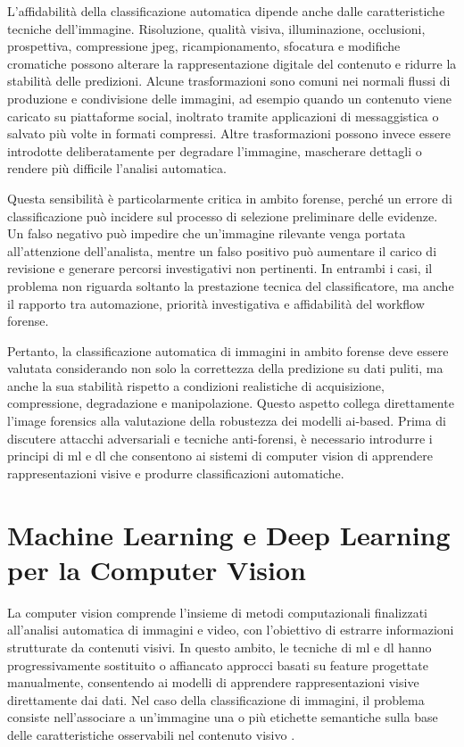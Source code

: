 L'affidabilità della classificazione automatica dipende anche dalle caratteristiche tecniche dell'immagine. Risoluzione, qualità visiva, illuminazione, occlusioni, prospettiva, compressione \gls{jpeg}, ricampionamento, sfocatura e modifiche cromatiche possono alterare la rappresentazione digitale del contenuto e ridurre la stabilità delle predizioni. Alcune trasformazioni sono comuni nei normali flussi di produzione e condivisione delle immagini, ad esempio quando un contenuto viene caricato su piattaforme social, inoltrato tramite applicazioni di messaggistica o salvato più volte in formati compressi. Altre trasformazioni possono invece essere introdotte deliberatamente per degradare l'immagine, mascherare dettagli o rendere più difficile l'analisi automatica.

Questa sensibilità è particolarmente critica in ambito forense, perché un errore di classificazione può incidere sul processo di selezione preliminare delle evidenze. Un falso negativo può impedire che un'immagine rilevante venga portata all'attenzione dell'analista, mentre un falso positivo può aumentare il carico di revisione e generare percorsi investigativi non pertinenti. In entrambi i casi, il problema non riguarda soltanto la prestazione tecnica del classificatore, ma anche il rapporto tra automazione, priorità investigativa e affidabilità del workflow forense.

Pertanto, la classificazione automatica di immagini in ambito forense deve essere valutata considerando non solo la correttezza della predizione su dati puliti, ma anche la sua stabilità rispetto a condizioni realistiche di acquisizione, compressione, degradazione e manipolazione. Questo aspetto collega direttamente l'image forensics alla valutazione della robustezza dei modelli \gls{ai}-based. Prima di discutere attacchi adversariali e tecniche anti-forensi, è necessario introdurre i principi di \gls{ml} e \gls{dl} che consentono ai sistemi di computer vision di apprendere rappresentazioni visive e produrre classificazioni automatiche.


\section{Machine Learning e Deep Learning per la Computer Vision}
\label{sec:background_ml_dl_cv}
La computer vision comprende l'insieme di metodi computazionali finalizzati all'analisi automatica di immagini e video, con l'obiettivo di estrarre informazioni strutturate da contenuti visivi. In questo ambito, le tecniche di \gls{ml} e \gls{dl} hanno progressivamente sostituito o affiancato approcci basati su feature progettate manualmente, consentendo ai modelli di apprendere rappresentazioni visive direttamente dai dati. Nel caso della classificazione di immagini, il problema consiste nell'associare a un'immagine una o più etichette semantiche sulla base delle caratteristiche osservabili nel contenuto visivo \cite{bishop2006pattern,gonzalez2018digital}.

